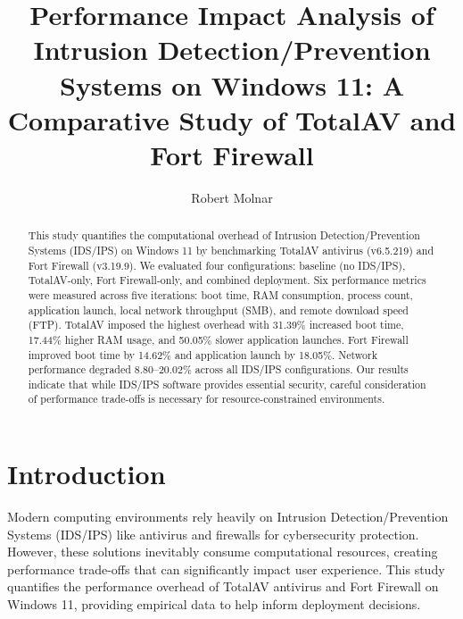 \documentclass[runningheads,a4paper,english]{llncs}[2022/01/12]
\begin{document}
\title{Performance Impact Analysis of Intrusion Detection/Prevention Systems on Windows 11: A Comparative Study of TotalAV and Fort Firewall}


\author{Robert Molnar}



\maketitle

\begin{abstract}
This study quantifies the computational overhead of Intrusion Detection/Prevention Systems (IDS/IPS) on Windows 11 by benchmarking TotalAV antivirus (v6.5.219) and Fort Firewall (v3.19.9). We evaluated four configurations: baseline (no IDS/IPS), TotalAV-only, Fort Firewall-only, and combined deployment. Six performance metrics were measured across five iterations: boot time, RAM consumption, process count, application launch, local network throughput (SMB), and remote download speed (FTP). TotalAV imposed the highest overhead with 31.39\% increased boot time, 17.44\% higher RAM usage, and 50.05\% slower application launches. Fort Firewall improved boot time by 14.62\% and application launch by 18.05\%. Network performance degraded 8.80--20.02\% across all IDS/IPS configurations. Our results indicate that while IDS/IPS software provides essential security, careful consideration of performance trade-offs is necessary for resource-constrained environments.

\end{abstract}

\section{Introduction}
\label{sec:introduction}

Modern computing environments rely heavily on Intrusion Detection/Prevention Systems (IDS/IPS) like antivirus and firewalls for cybersecurity protection. However, these solutions inevitably consume computational resources, creating performance trade-offs that can significantly impact user experience. This study quantifies the performance overhead of TotalAV antivirus and Fort Firewall on Windows 11, providing empirical data to help inform deployment decisions.
\end{document}
